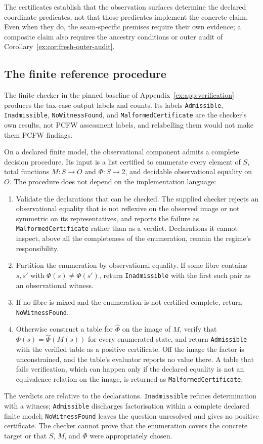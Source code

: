 \documentclass[smallextended,envcountsect,envcountsame,natbib]{svjour3}
\newcommand{\code}[1]{\texttt{#1}}
\begin{document}
The certificates establish that the observation surfaces determine the declared coordinate predicates, not that those predicates implement the concrete claim. Even when they do, the seam-specific premises require their own evidence; a composite claim also requires the ancestry conditions or outer audit of Corollary~\ref{ex:cor:fresh-outer-audit}.

\subsection{The finite reference procedure}\label{ex:sec:finite-procedure}

The finite checker in the pinned baseline of Appendix~\ref{ex:app:verification} produces the tax-case output labels and counts. Its labels \code{Admissible}, \code{Inadmissible}, \code{NoWitnessFound}, and \code{MalformedCertificate} are the checker's own results, not PCFW assessment labels, and relabelling them would not make them PCFW findings.

On a declared finite model, the observational component admits a complete decision procedure. Its input is a list certified to enumerate every element of $S$, total functions $M:S\to O$ and $\Phi:S\to 2$, and decidable observational equality on $O$. The procedure does not depend on the implementation language:
\begin{enumerate}
\item Validate the declarations that can be checked. The supplied checker rejects an observational equality that is not reflexive on the observed image or not symmetric on its representatives, and reports the failure as \code{MalformedCertificate} rather than as a verdict. Declarations it cannot inspect, above all the completeness of the enumeration, remain the regime's responsibility.
\item Partition the enumeration by observational equality. If some fibre contains $s,s'$ with $\Phi(s)\neq\Phi(s')$, return \code{Inadmissible} with the first such pair as an observational witness.
\item If no fibre is mixed and the enumeration is not certified complete, return \code{NoWitnessFound}.
\item Otherwise construct a table for $\widehat\Phi$ on the image of $M$, verify that $\Phi(s)=\widehat\Phi(M(s))$ for every enumerated state, and return \code{Admissible} with the verified table as a positive certificate. Off the image the factor is unconstrained, and the table's evaluator reports no value there. A table that fails verification, which can happen only if the declared equality is not an equivalence relation on the image, is returned as \code{MalformedCertificate}.
\end{enumerate}
The verdicts are relative to the declarations. \code{Inadmissible} refutes determination with a witness; \code{Admissible} discharges factorisation within a complete declared finite model; \code{NoWitnessFound} leaves the question unresolved and gives no positive certificate. The checker cannot prove that the enumeration covers the concrete target or that $S$, $M$, and $\Phi$ were appropriately chosen.
\end{document}

